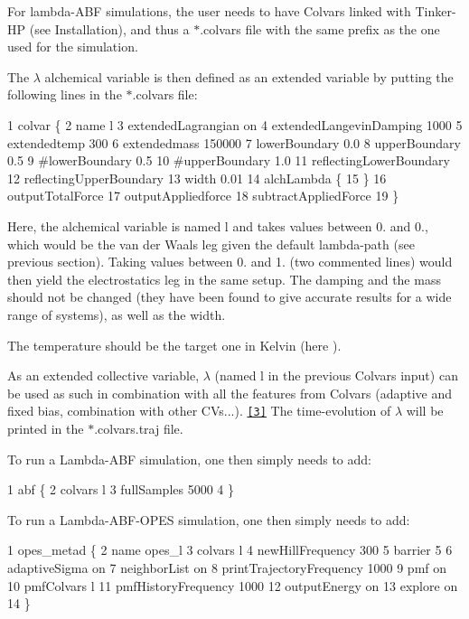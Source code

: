 For lambda-\/\-A\-B\-F simulations, the user needs to have Colvars linked with Tinker-\/\-H\-P (see Installation), and thus a {\ttfamily $\ast$.colvars} file with the same prefix as the one used for the simulation.

The $ \lambda $ alchemical variable is then defined as an extended variable by putting the following lines in the {\ttfamily $\ast$.colvars} file\-:


\begin{DoxyCode}
1 colvar \{
2   name l 
3   extendedLagrangian on
4   extendedLangevinDamping 1000
5   extendedtemp 300
6   extendedmass  150000
7   lowerBoundary 0.0
8   upperBoundary 0.5
9   #lowerBoundary 0.5
10   #upperBoundary 1.0
11   reflectingLowerBoundary
12   reflectingUpperBoundary
13   width 0.01
14   alchLambda \{
15   \}
16   outputTotalForce
17   outputAppliedforce
18   subtractAppliedForce
19 \}
\end{DoxyCode}


Here, the alchemical variable is named {\ttfamily l} and takes values between 0. and 0., which would be the van der Waals leg given the default lambda-\/path (see previous section). Taking values between 0. and 1. (two commented lines) would then yield the electrostatics leg in the same setup. The damping and the mass should not be changed (they have been found to give accurate results for a wide range of systems), as well as the width.

The temperature should be the target one in Kelvin (here {}).

As an extended collective variable, $ \lambda $ (named {\ttfamily l} in the previous Colvars input) can be used as such in combination with all the features from Colvars (adaptive and fixed bias, combination with other C\-Vs...). \href{#ref3}{\tt \mbox{[}3\mbox{]}} The time-\/evolution of $ \lambda $ will be printed in the {\ttfamily $\ast$.colvars.\-traj} file.

To run a Lambda-\/\-A\-B\-F simulation, one then simply needs to add\-: 
\begin{DoxyCode}
1 abf \{
2   colvars l
3   fullSamples 5000
4 \}
\end{DoxyCode}


To run a Lambda-\/\-A\-B\-F-\/\-O\-P\-E\-S simulation, one then simply needs to add\-: 
\begin{DoxyCode}
1 opes\_metad \{
2   name opes\_l
3   colvars l
4   newHillFrequency 300
5   barrier 5
6   adaptiveSigma on
7   neighborList on
8   printTrajectoryFrequency 1000
9   pmf on
10   pmfColvars l
11   pmfHistoryFrequency 1000
12   outputEnergy on
13   explore on
14 \}
\end{DoxyCode}


